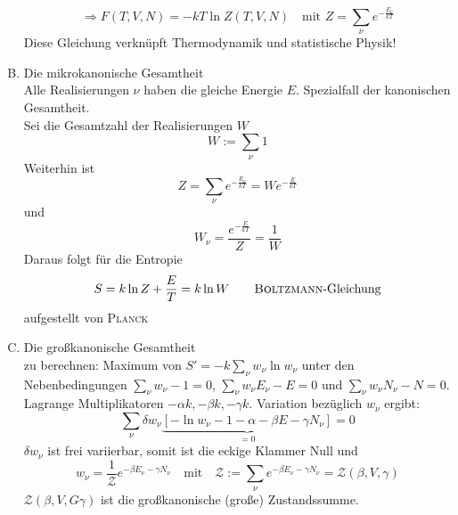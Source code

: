\begin{enumerate}[A)]
\begin{equation}
    \end{equation}
    \begin{equation}
        \Rightarrow F(T, V, N) = - k T \ln Z (T, V, N) \quad \text{mit } Z = \sum_\nu e^{- \frac{E_\nu}{k T}}
    \end{equation}
    Diese Gleichung verknüpft Thermodynamik und statistische Physik!
    \item Die mikrokanonische Gesamtheit \\
    Alle Realisierungen $\nu$ haben die gleiche Energie $E$. Spezialfall der kanonischen Gesamtheit.\\
    Sei die Gesamtzahl der Realisierungen $W$
    \begin{equation}
        W := \sum_\nu 1
    \end{equation}
    Weiterhin ist
    \begin{equation}
        Z = \sum_\nu e^{- \frac{E_\nu}{k T}} = W e^{- \frac{E}{k T}}
    \end{equation}
    und
    \begin{equation}
        W_\nu = \frac{e^{-\frac{E}{kT}}}{Z} = \frac{1}{W}
    \end{equation}
    Daraus folgt für die Entropie
    \begin{equation}
        S = k \ln Z + \frac{E}{T} = k \ln W  \qquad \text{\textsc{Boltzmann}-Gleichung}
    \end{equation}
    aufgestellt von \textsc{Planck}
    \item Die großkanonische Gesamtheit \\
    zu berechnen: Maximum von $S'=-k \sum_\nu w_\nu \ln w_\nu$ unter den Nebenbedingungen $\sum_\nu w_\nu - 1 = 0$, $\sum_\nu w_\nu E_\nu - E = 0$ und
    $\sum_\nu w_\nu N_\nu - N = 0$. \\
    Lagrange Multiplikatoren $-\alpha k, - \beta k, - \gamma k$. Variation bezüglich $w_\nu$ ergibt:
    \begin{equation}
        \sum_\nu \delta w_\nu \underbrace{\left[ - \ln w_\nu - 1 - \alpha - \beta E - \gamma N_\nu \right]}_{=0} = 0
    \end{equation}
    $\delta w_\nu$ ist frei variierbar, somit ist die eckige Klammer Null und
    \begin{equation}
        w_\nu = \frac{1}{\mathcal{Z}} e^{- \beta E_\nu- \gamma N_\nu} \quad \text{mit} \quad
        \mathcal{Z} := \sum_\nu e^{- \beta E_\nu - \gamma N_\nu} = \mathcal{Z}(\beta, V, \gamma)
    \end{equation}
    $\mathcal{Z}(\beta, V, G\gamma)$ ist die großkanonische (große) Zustandssumme. \\

\end{enumerate}
